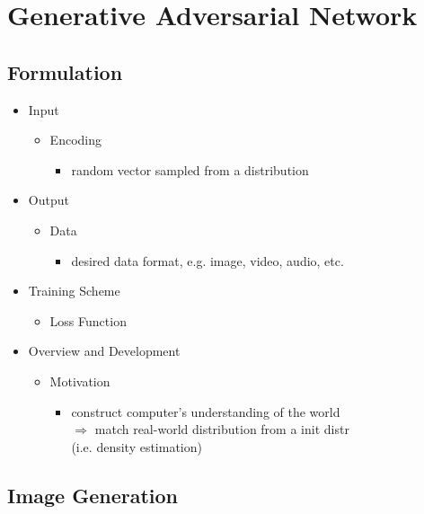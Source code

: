 \section{Generative Adversarial Network}
\subsection{Formulation}
\begin{itemize}
\item Input
	\begin{itemize}
	\item Encoding 
		\begin{itemize}
		\item random vector sampled from a distribution
		\end{itemize}
	\end{itemize}
\item Output
	\begin{itemize}
	\item Data
		\begin{itemize}
		\item desired data format, e.g. image, video, audio, etc.
		\end{itemize}
	\end{itemize}
\item Training Scheme
	\begin{itemize}
	\item Loss Function

	\end{itemize}
\item Overview and Development
	\begin{itemize}
	\item Motivation
		\begin{itemize}
		\item construct computer's understanding of the world \\
		$\Rightarrow$ match real-world distribution from a init distr \\
		(i.e. density estimation)
		\end{itemize}
	\end{itemize}
\end{itemize}

\subsection{Image Generation}
